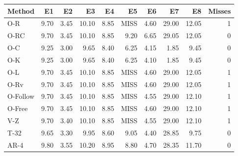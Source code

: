 \begin{tabular}{lrrrrrrrrr}
\toprule
Method & E1 & E2 & E3 & E4 & E5 & E6 & E7 & E8 & Misses \\
\midrule
O-R & 9.70 & 3.45 & 10.10 & 8.85 & MISS & 4.60 & 29.00 & 12.05 & 1 \\
O-RC & 9.70 & 3.45 & 10.10 & 8.85 & 9.20 & 6.65 & 29.05 & 12.05 & 0 \\
O-C & 9.25 & 3.00 & 9.65 & 8.40 & 6.25 & 4.15 & 1.85 & 9.45 & 0 \\
O-K & 9.25 & 3.00 & 9.65 & 8.40 & 6.25 & 4.10 & 1.85 & 9.45 & 0 \\
O-L & 9.70 & 3.45 & 10.10 & 8.85 & MISS & 4.60 & 29.00 & 12.05 & 1 \\
O-Rv & 9.70 & 3.45 & 10.10 & 8.85 & MISS & 4.60 & 29.00 & 12.05 & 1 \\
O-Follow & 9.70 & 3.45 & 10.10 & 8.85 & MISS & 4.55 & 29.00 & 12.10 & 1 \\
O-Free & 9.70 & 3.45 & 10.10 & 8.85 & MISS & 4.60 & 29.00 & 12.10 & 1 \\
V-Z & 9.70 & 3.40 & 10.10 & 8.85 & MISS & 4.55 & 29.00 & 12.10 & 1 \\
T-32 & 9.65 & 3.30 & 9.95 & 8.60 & 9.05 & 4.40 & 28.85 & 9.75 & 0 \\
AR-4 & 9.80 & 3.55 & 10.20 & 8.95 & 8.80 & 4.70 & 28.35 & 11.70 & 0 \\
\bottomrule
\end{tabular}
